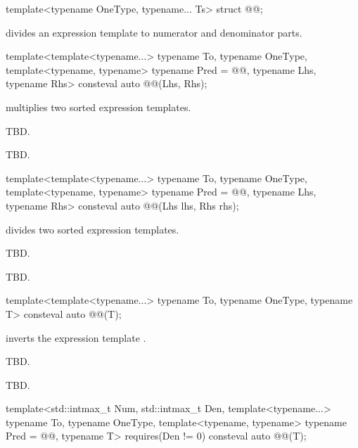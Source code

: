 \begin{codeblock}
template<typename OneType, typename... Ts>
struct @@;
\end{codeblock}

\pnum
{} divides an expression template to numerator and denominator parts.

\begin{itemdecl}
template<template<typename...> typename To, typename OneType,
         template<typename, typename> typename Pred = @@, typename Lhs, typename Rhs>
consteval auto @@(Lhs, Rhs);
\end{itemdecl}

\begin{itemdescr}
\pnum
{} multiplies two sorted expression templates.

\pnum
\effects
TBD.

\pnum
\returns
TBD.
\end{itemdescr}

\begin{itemdecl}
template<template<typename...> typename To, typename OneType,
         template<typename, typename> typename Pred = @@, typename Lhs, typename Rhs>
consteval auto @@(Lhs lhs, Rhs rhs);
\end{itemdecl}

\begin{itemdescr}
\pnum
{} divides two sorted expression templates.

\pnum
\effects
TBD.

\pnum
\returns
TBD.
\end{itemdescr}

\begin{itemdecl}
template<template<typename...> typename To, typename OneType, typename T>
consteval auto @@(T);
\end{itemdecl}

\begin{itemdescr}
\pnum
{} inverts the expression template .

\pnum
\effects
TBD.

\pnum
\returns
TBD.
\end{itemdescr}

\begin{itemdecl}
template<std::intmax_t Num, std::intmax_t Den, template<typename...> typename To,
         typename OneType, template<typename, typename> typename Pred = @@, typename T>
  requires(Den != 0)
consteval auto @@(T);
\end{itemdecl}

